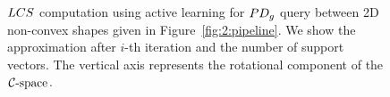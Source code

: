 \begin{figure}[htb]
\begin{center}
\caption[$\LCS$ computation using active learning for $\PDg$ query between 2D non-convex shapes]{$\LCS$ computation using active learning for $\PDg$ query between 2D non-convex shapes given in Figure~\ref{fig:2:pipeline}. We show the approximation after $i$-th iteration and the number of support vectors. The vertical axis represents the rotational component of the $\mathcal C\text{-space}$. }
\label{fig:2:LCSinActiveLearning2D2}
\end{center}
\end{figure}


